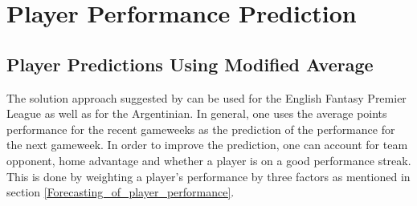 \newpage



\section{Player Performance Prediction} \label{Player_Performance}



\subsection{Player Predictions Using Modified Average} \label{Sol_approach_Modified_Average}

The solution approach suggested by \cite{Bonomo} can be used for the English Fantasy Premier League as well as for the Argentinian. In general, one uses the average points performance for the recent gameweeks as the prediction of the performance for the next gameweek. In order to improve the prediction, one can account for team opponent, home advantage and whether a player is on a good performance streak. This is done by weighting a player's performance by three factors as mentioned in section \ref{Forecasting_of_player_performance}.

\newpar

